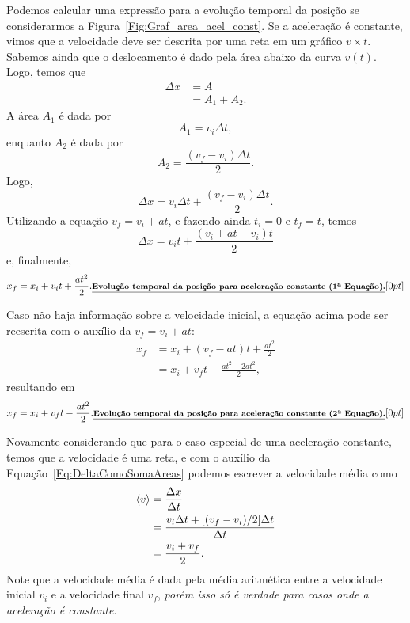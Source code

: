 Podemos calcular uma expressão para a evolução temporal da posição se considerarmos a Figura~\ref{Fig:Graf_area_acel_const}. Se a aceleração é constante, vimos que a velocidade deve ser descrita por uma reta em um gráfico $v\times t$. Sabemos ainda que o deslocamento é dado pela área abaixo da curva $v(t)$. Logo, temos que
\begin{align}
	\Delta x &= A \\
			 &= A_1 + A_2.
\end{align}
%
A área $A_1$ é dada por
\begin{equation}
	A_1 = v_i \Delta t,
\end{equation}
%
enquanto $A_2$ é dada por
\begin{equation}
	A_2 = \frac{(v_f - v_i)\Delta t}{2}.
\end{equation}
%
Logo,
\begin{equation}\label{Eq:DeltaComoSomaAreas}
  \Delta x = v_i\Delta t + \frac{(v_f - v_i)\Delta t}{2}.
\end{equation}
%
Utilizando a equação $v_f = v_i + at$, e fazendo ainda $t_i = 0$ e $t_f = t$, temos
\begin{equation}
  \Delta x = v_i t + \frac{(v_i + at - v_i) t}{2}
\end{equation}
%
e, finalmente,
\begin{equation}\label{Eq:XX0V0TAT22}
  x_f = x_i + v_i t +\frac{at^2}{2}.\mathnote{Evolução temporal da posição para aceleração constante (1\textordfeminine~Equação).}
\end{equation}

Caso não haja informação sobre a velocidade inicial, a equação acima pode ser reescrita com o auxílio da $v_f = v_i + at$:
\begin{align}
  x_f &= x_i + (v_f - at) t + \frac{at^2}{2} \\
  &= x_i + v_f t + \frac{at^2 - 2at^2}{2},
\end{align}
%
resultando em
\begin{equation}
  x_f = x_i + v_f t - \frac{at^2}{2}.\mathnote{Evolução temporal da posição para aceleração constante (2\textordfeminine~Equação).}
\end{equation}

Novamente considerando que para o caso especial de uma aceleração constante, temos que a velocidade é uma reta, e com o auxílio da Equação~\eqref{Eq:DeltaComoSomaAreas} podemos escrever a velocidade média como
\begin{align}
  \left\langle{v}\right\rangle &= \frac{\Delta x}{\Delta t} \\
  &= \frac{v_i \Delta t + [(v_f - v_i)/2] \Delta t}{\Delta t} \\
  &= \frac{v_i + v_f}{2}. \label{Eq:VelMediaComoMedAritParaAcelConst}
\end{align}
%
Note que a velocidade média é dada pela média aritmética entre a velocidade inicial $v_i$ e a velocidade final $v_f$, \emph{porém isso só é verdade para casos onde a aceleração é constante}.

